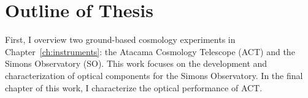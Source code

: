 


\section{Outline of Thesis}

First, I overview two ground-based cosmology experiments in Chapter~\ref{ch:instruments}: the Atacama Cosmology Telescope (ACT) and the Simons Observatory (SO).  This work focuses on the development and characterization of optical components for the Simons Observatory.  In the final chapter of this work, I characterize the optical performance of ACT.

